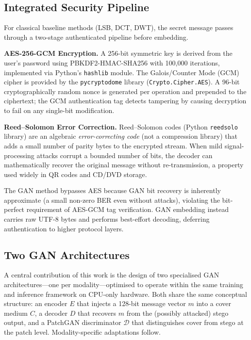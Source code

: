 \documentclass[conference]{IEEEtran}
\begin{document}
\subsection{Integrated Security Pipeline}

For classical baseline methods (LSB, DCT, DWT), the secret message
passes through a two-stage authenticated pipeline before embedding.

\textbf{AES-256-GCM Encryption.} A 256-bit symmetric key is derived
from the user's password using PBKDF2-HMAC-SHA256 with 100{,}000
iterations, implemented via Python's \texttt{hashlib} module. The
Galois/Counter Mode (GCM) cipher is provided by the
\texttt{pycryptodome} library (\texttt{Crypto.Cipher.AES}). A 96-bit
cryptographically random nonce is generated per operation and
prepended to the ciphertext; the GCM authentication tag detects
tampering by causing decryption to fail on any single-bit
modification.

\textbf{Reed–Solomon Error Correction.} Reed–Solomon codes
(Python \texttt{reedsolo} library) are an algebraic
\textit{error-correcting code} (not a compression library) that adds
a small number of parity bytes to the encrypted stream. When mild
signal-processing attacks corrupt a bounded number of bits, the
decoder can mathematically recover the original message without
re-transmission, a property used widely in QR codes and CD/DVD
storage.

The GAN method bypasses AES because GAN bit recovery is inherently
approximate (a small non-zero BER even without attacks), violating
the bit-perfect requirement of AES-GCM tag verification. GAN
embedding instead carries raw UTF-8 bytes and performs best-effort
decoding, deferring authentication to higher protocol layers.

\subsection{Two GAN Architectures}

A central contribution of this work is the design of two
specialised GAN architectures—one per modality—optimised to operate
within the same training and inference framework on CPU-only
hardware. Both share the same conceptual structure: an encoder
$E$ that injects a 128-bit message vector $m$ into a cover medium
$C$, a decoder $D$ that recovers $m$ from the (possibly attacked)
stego output, and a PatchGAN discriminator $\mathcal{D}$ that
distinguishes cover from stego at the patch level. Modality-specific
adaptations follow.
\end{document}
